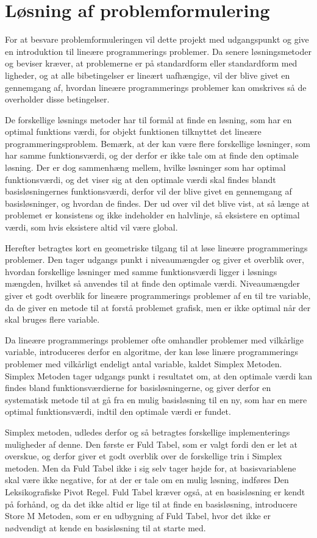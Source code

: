\section{Løsning af problemformulering}
For at besvare problemformuleringen vil dette projekt med udgangspunkt \citep{bert} og \citep{lay} give en introduktion til lineære programmerings problemer. 
Da senere løsningsmetoder og beviser kræver, at problemerne er på standardform eller standardform med ligheder, og at alle bibetingelser er lineært uafhængige, vil der blive givet en gennemgang af, hvordan lineære programmerings problemer kan omskrives så de overholder disse betingelser.

De forskellige løsnings metoder har til formål at finde en løsning, som har en optimal funktions værdi, for objekt funktionen tilknyttet det lineære programmeringsproblem.
Bemærk, at der kan være flere forskellige løsninger, som har samme funktionsværdi, og der derfor er ikke tale om at finde den optimale løsning. 
Der er dog sammenhæng mellem, hvilke løsninger som har optimal funktionsværdi, og det viser sig at den optimale værdi skal findes blandt basisløsningernes funktionsværdi, derfor vil der blive givet en gennemgang af basisløsninger, og hvordan de findes.
Der ud over vil det blive vist, at så længe at problemet er konsistens og ikke indeholder en halvlinje, så eksistere en optimal værdi, som hvis eksistere altid vil være global.

Herefter betragtes kort en geometriske tilgang til at løse lineære programmerings problemer.
Den tager udgangs punkt i niveaumængder og giver et overblik over, hvordan forskellige løsninger med samme funktionsværdi ligger i løsnings mængden, hvilket så anvendes til at finde den optimale værdi. 
Niveaumængder giver et godt overblik for lineære programmerings problemer af en til tre variable, da de giver en metode til at forstå problemet grafisk, men er ikke optimal når der skal bruges flere variable.

Da lineære programmerings problemer ofte omhandler problemer med vilkårlige variable, introduceres derfor en algoritme, der kan løse linære programmerings problemer med vilkårligt endeligt antal variable, kaldet Simplex Metoden.
Simplex Metoden tager udgangs punkt i resultatet om, at den optimale værdi kan findes bland funktionsværdierne for basisløsningerne, og giver derfor en systematisk metode til at gå fra en mulig basisløsning til en ny, som har en mere optimal funktionsværdi, indtil den optimale værdi er fundet.

Simplex metoden, udledes derfor og så betragtes forskellige implementerings muligheder af denne.
Den første er Fuld Tabel, som er valgt fordi den er let at overskue, og derfor giver et godt overblik over de forskellige trin i Simplex metoden.
Men da Fuld Tabel ikke i sig selv tager højde for, at basisvariablene skal være ikke negative, for at der er tale om en mulig løsning, indføres Den Leksikografiske Pivot Regel.
Fuld Tabel kræver også, at en basisløsning er kendt på forhånd, og da det ikke altid er lige til at finde en basisløsning, introducere Store M Metoden, som er en udbygning af Fuld Tabel, hvor det ikke er nødvendigt at kende en basisløsning til at starte med.

